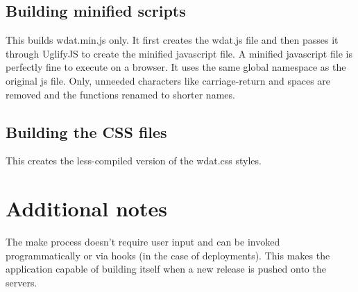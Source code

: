 \subsection{Building minified scripts}

\lstset{language=sh, tabsize=4}

This builds wdat.min.js only.  It first creates the wdat.js file and
then passes it through UglifyJS to create the minified javascript
file.  A minified javascript file is perfectly fine to execute on a
browser.  It uses the same global namespace as the original js file.
Only, unneeded characters like carriage-return and spaces are removed
and the functions renamed to shorter names.

\subsection{Building the CSS files}

\lstset{language=sh, tabsize=4}

This creates the less-compiled version of the wdat.css styles.


\section{Additional notes}

The make process doesn't require user input and can be invoked
programmatically or via hooks (in the case of deployments).  This
makes the application capable of building itself when a new release is
pushed onto the servers.
